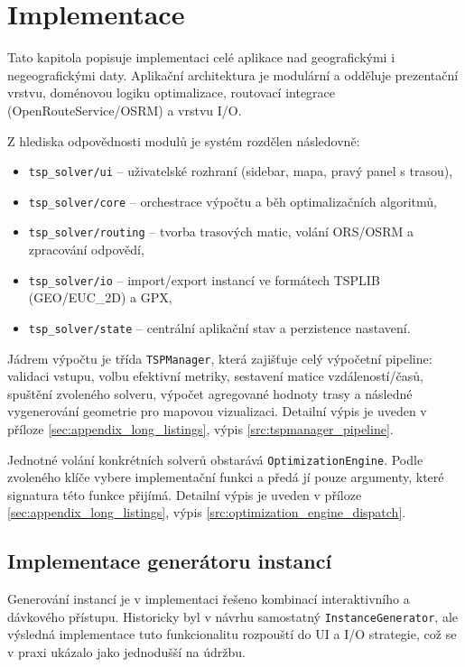 \chapter{Implementace}

Tato kapitola popisuje implementaci celé aplikace nad geografickými i negeografickými daty. Aplikační architektura je modulární a odděluje prezentační vrstvu, doménovou logiku optimalizace, routovací integrace (OpenRouteService/OSRM) a vrstvu I/O.

Z hlediska odpovědnosti modulů je systém rozdělen následovně:
\begin{itemize}
    \item \texttt{tsp\_solver/ui} -- uživatelské rozhraní (sidebar, mapa, pravý panel s trasou),
    \item \texttt{tsp\_solver/core} -- orchestrace výpočtu a běh optimalizačních algoritmů,
    \item \texttt{tsp\_solver/routing} -- tvorba trasových matic, volání ORS/OSRM a zpracování odpovědí,
    \item \texttt{tsp\_solver/io} -- import/export instancí ve formátech TSPLIB (GEO/EUC\_2D) a GPX,
    \item \texttt{tsp\_solver/state} -- centrální aplikační stav a perzistence nastavení.
\end{itemize}

Jádrem výpočtu je třída \texttt{TSPManager}, která zajišťuje celý výpočetní pipeline: validaci vstupu, volbu efektivní metriky, sestavení matice vzdáleností/časů, spuštění zvoleného solveru, výpočet agregované hodnoty trasy a následné vygenerování geometrie pro mapovou vizualizaci. Detailní výpis je uveden v příloze \ref{sec:appendix_long_listings}, výpis \ref{src:tspmanager_pipeline}.

Jednotné volání konkrétních solverů obstarává \texttt{OptimizationEngine}. Podle zvoleného klíče vybere implementační funkci a předá jí pouze argumenty, které signatura této funkce přijímá. Detailní výpis je uveden v příloze \ref{sec:appendix_long_listings}, výpis \ref{src:optimization_engine_dispatch}.

\section{Implementace generátoru instancí}
Generování instancí je v implementaci řešeno kombinací interaktivního a dávkového přístupu. Historicky byl v návrhu samostatný \texttt{InstanceGenerator}, ale výsledná implementace tuto funkcionalitu rozpouští do UI a I/O strategie, což se v praxi ukázalo jako jednodušší na údržbu.

